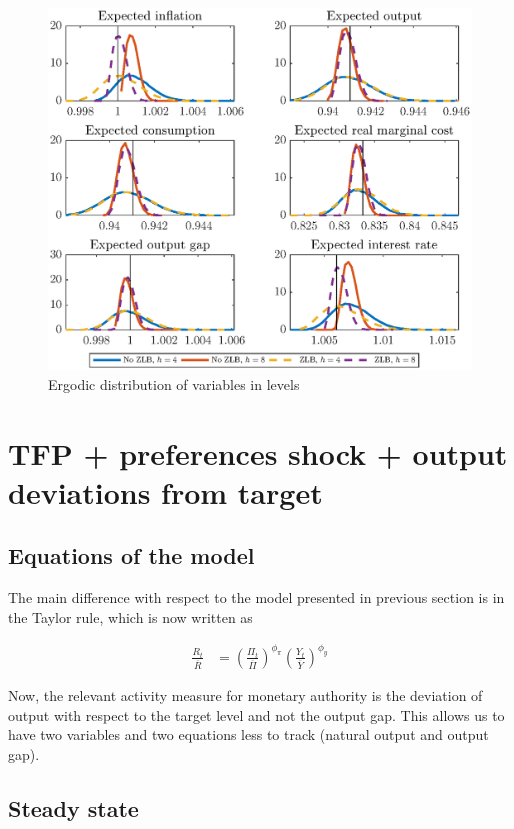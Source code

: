 \documentclass[12pt]{article}
\numberwithin{equation}{section}
\begin{document}
\begin{figure}[H]
	\centering
	\caption{Ergodic distribution of variables in levels}\label{fig:m2_distExp}
	\includegraphics[scale=0.7]{m2_distExp}
\end{figure}

\section{TFP + preferences shock + output deviations from target}

\subsection{Equations of the model}

The main difference with respect to the model presented in previous section is in the Taylor rule, which is now written as

\begin{align*}
	\frac{R_t}{\overline R}&=\left(\frac{\Pi_t}{\overline\Pi}\right)^{\phi_{\pi}}\left(\frac{Y_t}{\overline{Y}}\right)^{\phi_{y}}\label{app:m3_taylor}
\end{align*}

Now, the relevant activity measure for monetary authority is the deviation of output with respect to the target level and not the output gap. This allows us to have two variables and two equations less to track (natural output and output gap).

\subsection{Steady state}
\end{document}
